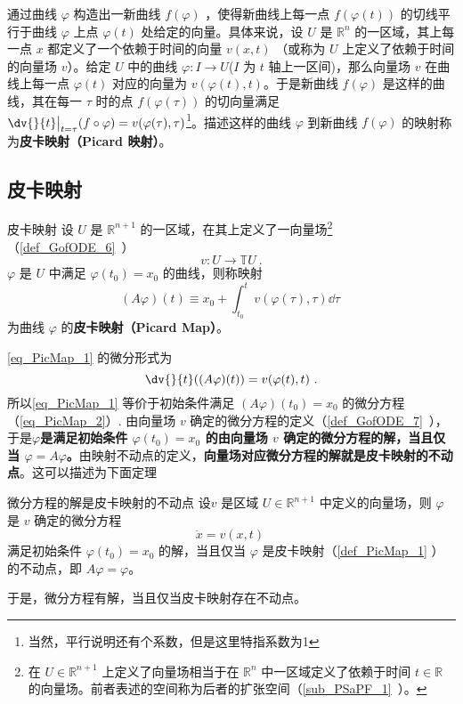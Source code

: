 
\begin{issues}
\issueDraft
\end{issues}

通过曲线 $\varphi$ 构造出一新曲线 $f(\varphi)$ ，使得新曲线上每一点 $f(\varphi(t))$ 的切线平行于曲线 $\varphi$ 上点 $\varphi(t)$ 处给定的向量。具体来说，设 $U$ 是 $\mathbb R^n$ 的一区域，其上每一点 $x$ 都定义了一个依赖于时间的向量 $v(x,t)$ （或称为 $U$ 上定义了依赖于时间的向量场 $v$）。给定 $U$ 中的曲线 $\varphi:I\rightarrow U$($I$ 为 $t$ 轴上一区间)，那么向量场 $v$ 在曲线上每一点 $\varphi(t)$ 对应的向量为 $v(\varphi(t),t)$。于是新曲线 $f(\varphi)$ 是这样的曲线，其在每一 $\tau$ 时的点 $f(\varphi(\tau))$ 的切向量满足 $\dv{}{t}\big|_{t=\tau}(f\circ \varphi)=v(\varphi(\tau),\tau)$\footnote{当然，平行说明还有个系数，但是这里特指系数为1}。描述这样的曲线 $\varphi$ 到新曲线 $f(\varphi)$ 的映射称为\textbf{皮卡映射（Picard 映射）}。
\subsection{皮卡映射}
\begin{definition}{皮卡映射}\label{def_PicMap_1}
设 $U$ 是 $\mathbb R^{n+1}$ 的一区域，在其上定义了一向量场\footnote{在 $U\in\mathbb R^{n+1}$ 上定义了向量场相当于在 $\mathbb R^n$ 中一区域定义了依赖于时间 $t\in\mathbb R$ 的向量场。前者表述的空间称为后者的扩张空间（\autoref{sub_PSaPF_1}~）。}（\autoref{def_GofODE_6}~） 
\begin{equation}
v:U\rightarrow\mathbb TU~.
\end{equation}
$\varphi$ 是 $U$ 中满足 $\varphi(t_0)=x_0$ 的曲线，则称映射
\begin{equation}\label{eq_PicMap_1}
(A\varphi)(t)\equiv x_0+\int_{t_0}^{t}v(\varphi(\tau),\tau)\dd \tau~
\end{equation}
为曲线 $\varphi$ 的\textbf{皮卡映射（Picard Map）}。
\end{definition}
\autoref{eq_PicMap_1} 的微分形式为
\begin{equation}\label{eq_PicMap_2}
\dv{}{t}((A\varphi)(t))=v(\varphi(t),t)~.
\end{equation}
所以\autoref{eq_PicMap_1} 等价于初始条件满足 $(A\varphi)(t_0)=x_0$ 的微分方程（\autoref{eq_PicMap_2}）. 由向量场 $v$ 确定的微分方程的定义（\autoref{def_GofODE_7}~），于是\textbf{$\varphi$是满足初始条件 $\varphi(t_0)=x_0$ 的由向量场 $v$ 确定的微分方程的解，当且仅当 $\varphi=A\varphi$。}由映射不动点的定义，\textbf{向量场对应微分方程的解就是皮卡映射的不动点}。这可以描述为下面定理
\begin{theorem}{微分方程的解是皮卡映射的不动点}
设$v$ 是区域 $U\in\mathbb R^{n+1}$ 中定义的向量场，则 $\varphi$ 是 $v$ 确定的微分方程
\begin{equation}\label{eq_PicMap_3}
\dot x=v(x,t)~
\end{equation}
满足初始条件 $\varphi(t_0)=x_0$ 的解，当且仅当 $\varphi$ 是皮卡映射（\autoref{def_PicMap_1} ）的不动点，即 $A\varphi=\varphi$。
\end{theorem}
于是，微分方程有解，当且仅当皮卡映射存在不动点。
